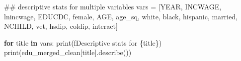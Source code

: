 \documentclass[
  letterpaper,
  DIV=11,
  numbers=noendperiod]{scrartcl}
\newenvironment{Shaded}{\begin{snugshade}}{\end{snugshade}}
\newcommand{\BuiltInTok}[1]{\textcolor[rgb]{0.00,0.23,0.31}{#1}}
\newcommand{\CommentTok}[1]{\textcolor[rgb]{0.37,0.37,0.37}{#1}}
\newcommand{\ControlFlowTok}[1]{\textcolor[rgb]{0.00,0.23,0.31}{\textbf{#1}}}
\newcommand{\KeywordTok}[1]{\textcolor[rgb]{0.00,0.23,0.31}{\textbf{#1}}}
\newcommand{\NormalTok}[1]{\textcolor[rgb]{0.00,0.23,0.31}{#1}}
\newcommand{\OperatorTok}[1]{\textcolor[rgb]{0.37,0.37,0.37}{#1}}
\newcommand{\SpecialCharTok}[1]{\textcolor[rgb]{0.37,0.37,0.37}{#1}}
\newcommand{\SpecialStringTok}[1]{\textcolor[rgb]{0.13,0.47,0.30}{#1}}
\newcommand{\StringTok}[1]{\textcolor[rgb]{0.13,0.47,0.30}{#1}}
\begin{document}
\begin{Shaded}
\begin{Highlighting}[]
\CommentTok{\#\# descriptive stats for multiple variables }
\BuiltInTok{vars} \OperatorTok{=}\NormalTok{ [}\StringTok{\textquotesingle{}YEAR\textquotesingle{}}\NormalTok{, }\StringTok{\textquotesingle{}INCWAGE\textquotesingle{}}\NormalTok{, }\StringTok{\textquotesingle{}lnincwage\textquotesingle{}}\NormalTok{, }\StringTok{\textquotesingle{}EDUCDC\textquotesingle{}}\NormalTok{, }\StringTok{\textquotesingle{}female\textquotesingle{}}\NormalTok{, }\StringTok{\textquotesingle{}AGE\textquotesingle{}}\NormalTok{, }\StringTok{\textquotesingle{}age\_sq\textquotesingle{}}\NormalTok{, }\StringTok{\textquotesingle{}white\textquotesingle{}}\NormalTok{, }\StringTok{\textquotesingle{}black\textquotesingle{}}\NormalTok{, }\StringTok{\textquotesingle{}hispanic\textquotesingle{}}\NormalTok{, }\StringTok{\textquotesingle{}married\textquotesingle{}}\NormalTok{, }\StringTok{\textquotesingle{}NCHILD\textquotesingle{}}\NormalTok{, }\StringTok{\textquotesingle{}vet\textquotesingle{}}\NormalTok{, }\StringTok{\textquotesingle{}hsdip\textquotesingle{}}\NormalTok{, }\StringTok{\textquotesingle{}coldip\textquotesingle{}}\NormalTok{, }\StringTok{\textquotesingle{}interact\textquotesingle{}}\NormalTok{]}

\ControlFlowTok{for}\NormalTok{ title }\KeywordTok{in} \BuiltInTok{vars}\NormalTok{: }
  \BuiltInTok{print}\NormalTok{(}\SpecialStringTok{f\textquotesingle{}Descriptive stats for }\SpecialCharTok{\{}\NormalTok{title}\SpecialCharTok{\}}\SpecialStringTok{\textquotesingle{}}\NormalTok{)}
  \BuiltInTok{print}\NormalTok{(edu\_merged\_clean[title].describe())}
\end{Highlighting}
\end{Shaded}
\end{document}
